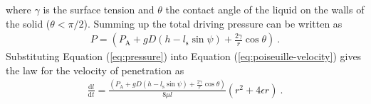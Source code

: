 \documentclass[aip, amsmath, amssymb, reprint, twocolumn, floatfix]{revtex4-1}
\newcommand{\dldt}{\frac{\mathrm{d}l}{\mathrm{d}t}}
\newcommand{\Pa}{P_\mathrm{A}}
\newcommand{\Pt}{P}
\newcommand{\ls}{l_\mathrm{s}}
\begin{document}
where $\gamma$ is the surface tension and $\theta$ the contact angle of the liquid on the walls of the solid ($\theta < \pi/2$). Summing up the total driving pressure can be written as
\begin{gather}
	\Pt = \left(\Pa + gD (h - \ls \sin \psi) + \frac{2\gamma}{r}\cos \theta\right)~.
	\label{eq:pressure}
\end{gather}
Substituting Equation (\ref{eq:pressure}) into Equation (\ref{eq:poiseuille-velocity}) gives the law for the velocity of penetration as 
\begin{gather}
	\dldt = \frac{\left(\Pa + gD (h - \ls \sin \psi) + \frac{2\gamma}{r}\cos \theta\right)}{8\mu l}\left(r^2 + 4\epsilon r \right)~.
	\label{eq:poiseuille-velocity-pressure}
\end{gather}
\bigskip
\end{document}
